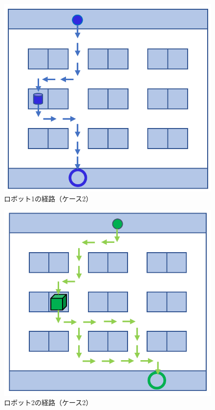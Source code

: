 \begin{figure}[!t]
    \centering
    \includegraphics[scale=0.3]{figures/HITL1_case2_G1.png}
    \caption{ロボット1の経路（ケース2）}
    \label{fig:HITL1_case2_G1}
\end{figure}
\begin{figure}[!t]
    \centering
    \includegraphics[scale=0.3]{figures/HITL1_case2_G2.png}
    \caption{ロボット2の経路（ケース2）}
    \label{fig:HITL1_case2_G2}
\end{figure}
